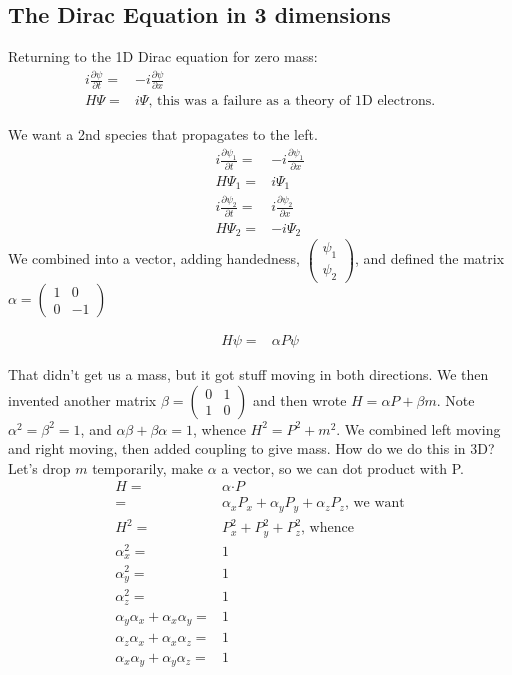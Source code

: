 \documentclass[]{article}
\begin{document}
\subsection{The Dirac Equation in 3 dimensions}

Returning to the 1D Dirac equation for zero mass:
\begin{align*}
i \frac{\partial \psi}{\partial t}=& -i \frac{\partial \psi}{\partial x} \\
H \Psi =& i \Psi \text{, this was a failure as a theory of 1D electrons.}
\end{align*}

We want a 2nd species that propagates to the left.
\begin{align*}
i \frac{\partial \psi_1}{\partial t}=& -i \frac{\partial \psi_1}{\partial x} \\
H \Psi_1 =& i \Psi_1\\
i \frac{\partial \psi_2}{\partial t}=& i \frac{\partial \psi_2}{\partial x} \\
H \Psi_2 =& -i \Psi_2
\end{align*}
We combined into a vector, adding handedness, $\begin{pmatrix} \psi_1\\ \psi_2 \end{pmatrix}$, and defined the matrix $\alpha = \begin{pmatrix}
1&0\\
0&-1
\end{pmatrix}$

\begin{align*}
H \psi =& \alpha P \psi
\end{align*}

That didn't get us a mass, but it got stuff moving in both directions. We then invented another matrix $\beta=\begin{pmatrix}
0&1\\
1&0
\end{pmatrix}$ and then wrote $H = \alpha P + \beta m$. Note $\alpha^2=\beta^2=1$, and $\alpha\beta + \beta\alpha=1$, whence $H^2=P^2+m^2$. We combined left moving and right moving, then added coupling to give mass. How do we do this in 3D?
 Let's  drop $m$ temporarily, make $\alpha$ a vector, so we can dot product with P.
\begin{align*}
H =& \alpha \boldsymbol{\cdot} P\\
=& \alpha_x P_x + \alpha_y P_y + \alpha_z P_z \text{, we want}\\
H^2 =& P_x^2 + P_y^2 + P_z^2 \text{, whence}\\
\alpha_x^2 =&1\\
\alpha_y^2 = &1\\
\alpha_z^2 =& 1 \\
\alpha_y\alpha_x + \alpha_x\alpha_y=&1\\
\alpha_z\alpha_x + \alpha_x\alpha_z=&1\\
\alpha_x\alpha_y + \alpha_y\alpha_z=&1
\end{align*}
\end{document}

